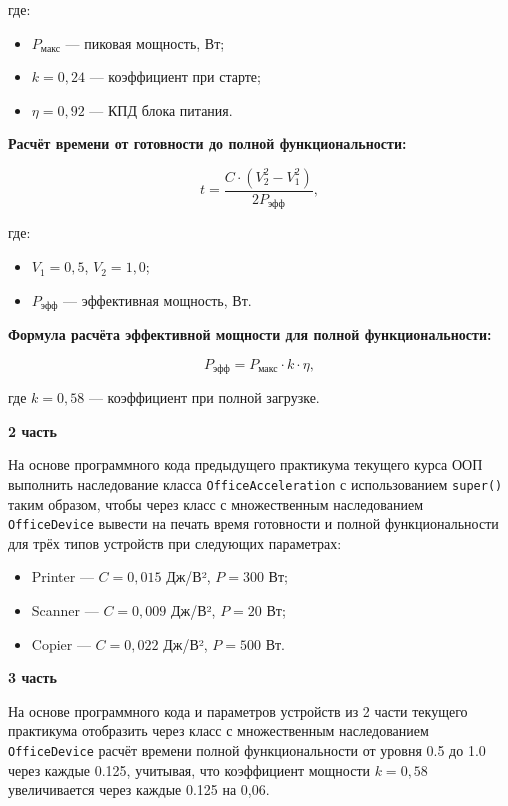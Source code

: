 \begin{enumerate}
где:  
\begin{itemize}
    \item $P_{\text{макс}}$ — пиковая мощность, Вт;  
    \item $k = 0{,}24$ — коэффициент при старте;  
    \item $\eta = 0{,}92$ — КПД блока питания.  
\end{itemize}

\textbf{Расчёт времени от готовности до полной функциональности:}

\begin{equation}
t = \frac{C \cdot (V_2^2 - V_1^2)}{2P_{\text{эфф}}},
\end{equation}

где:  
\begin{itemize}
    \item $V_1 = 0{,}5$, $V_2 = 1{,}0$;  
    \item $P_{\text{эфф}}$ — эффективная мощность, Вт.  
\end{itemize}

\textbf{Формула расчёта эффективной мощности для полной функциональности:}

\begin{equation}
P_{\text{эфф}} = P_{\text{макс}} \cdot k \cdot \eta,
\end{equation}

где $k = 0{,}58$ — коэффициент при полной загрузке.

\textbf{2 часть}

На основе программного кода предыдущего практикума текущего курса ООП выполнить наследование класса \texttt{OfficeAcceleration} с использованием \texttt{super()} таким образом, чтобы через класс с множественным наследованием \texttt{OfficeDevice} вывести на печать время готовности и полной функциональности для трёх типов устройств при следующих параметрах:

\begin{itemize}
    \item Printer — $C = 0{,}015$ Дж/В², $P = 300$ Вт;  
    \item Scanner — $C = 0{,}009$ Дж/В², $P = 20$ Вт;  
    \item Copier — $C = 0{,}022$ Дж/В², $P = 500$ Вт.  
\end{itemize}

\textbf{3 часть}

На основе программного кода и параметров устройств из 2 части текущего практикума отобразить через класс с множественным наследованием \texttt{OfficeDevice} расчёт времени полной функциональности от уровня 0.5 до 1.0 через каждые 0.125, учитывая, что коэффициент мощности $k = 0{,}58$ увеличивается через каждые 0.125 на 0{,}06.


\end{enumerate}
